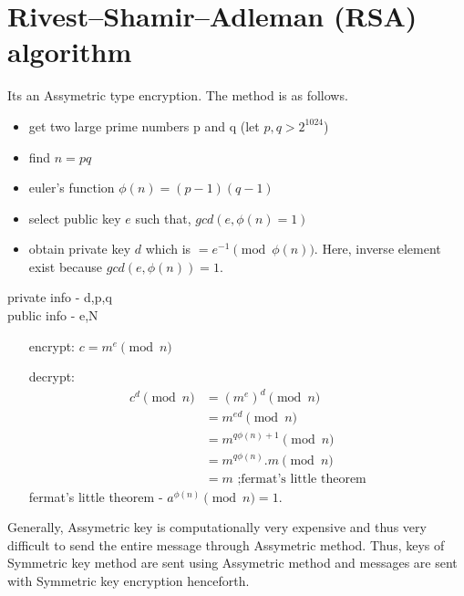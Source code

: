 \documentclass[english, 11pt]{article}
\begin{document}
\begin{figure}[ht]


  \centering   
\end{figure}

\section*{Rivest–Shamir–Adleman (RSA) algorithm}
Its an Assymetric type encryption. The method is as follows.
\begin{itemize}
  \item get two large prime numbers p and q (let $p,q > 2^{1024}$)
  \item find $n = pq$
  \item euler's function $\phi(n) = (p-1)(q-1)$
  \item select public key $e$ such that, $gcd(e,\phi(n) = 1)$
  \item obtain private key $d$ which is $= e^{-1} \pmod{\phi(n)} $. Here, inverse element exist because $gcd(e,\phi(n)) = 1$.
\end{itemize}
private info - d,p,q \\
public info - e,N
\begin{itemize}
  \item[encrypt:] $c = m^e \pmod{n}$
  \item[decrypt:] 
  \begin{align*}
    c^d \pmod{n} &= (m^e)^d \pmod{n} \\
    &= m^{ed} \pmod{n} \\
    &= m^{q\phi(n) + 1} \pmod{n} \\
    &= m^{q\phi(n)}.m \pmod{n} \\
    &= m \text{      ;fermat's little theorem}
  \end{align*}
  fermat's little theorem - $a^{\phi(n)} \pmod{n} = 1$.
\end{itemize}
Generally, Assymetric key is computationally very expensive and thus very difficult to send the entire message through Assymetric method. Thus, keys of Symmetric key method are sent using Assymetric method and messages are sent with Symmetric key encryption henceforth.
\end{document}
